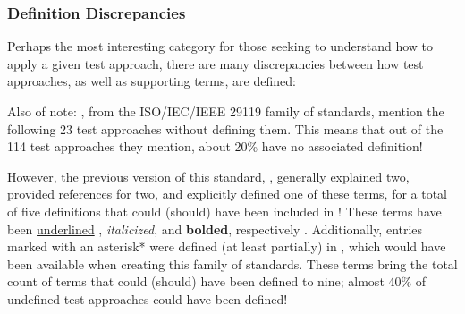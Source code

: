 \ifnotpaper
    \begin{landscape}
        
    \end{landscape}
\else %
\fi

\subsubsection{Definition Discrepancies}
\label{defs}

Perhaps the most interesting category for those seeking to understand how to
apply a given test approach, there are many discrepancies between how test
approaches, as well as supporting terms, are defined:



\ifnotpaper
    Also of note: \citep{IEEE2022, IEEE2021}, from the
    ISO/IEC/IEEE 29119 family of standards, mention the following 23 test
    approaches without defining them. This means that out of the 114 test
    approaches they mention, about 20\% have no associated definition!

    However, the previous version of this standard, \citeyearpar{IEEE2013},
    generally explained two, provided references for two, and explicitly defined
    one of these terms, for a total of five definitions that could (should) have
    been included in \citeyearpar{IEEE2022}! These terms have been
    \underline{underlined}\ifnotpaper%
        , \emph{italicized}, and \textbf{bolded}, respectively%
    \fi. Additionally, entries marked with an asterisk* were defined (at least
    partially) in \citeyearpar{IEEE2017}, which would have been available when
    creating this family of standards. These terms bring the total count of terms
    that could (should) have been defined to nine; almost 40\% of undefined test
    approaches could have been defined!

